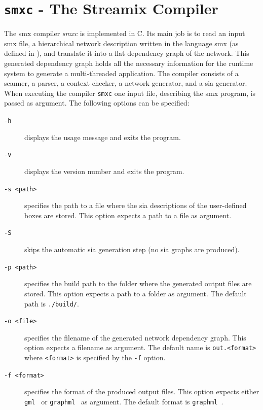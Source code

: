 \section{\texttt{smxc} - The Streamix Compiler}
\label{sect_tool_smxc}
The \gls*{smx} compiler \emph{smxc} is implemented in C.
Its main job is to read an input \gls*{smx} file, \ie a hierarchical network description written in the language \gls*{smx} (as defined in \Chap{\ref{chap_smx}}), and translate it into a flat dependency graph of the network.
This generated dependency graph holds all the necessary information for the runtime system to generate a multi-threaded application.
The compiler consists of a scanner, a parser, a context checker, a network generator, and a \gls{sia} generator.
When executing the compiler \texttt{smxc} one input file, describing the \gls*{smx} program, is passed as argument.
The following options can be specified:
\begin{description}
    \item[\texttt{-h}] displays the usage message and exits the program.
    \item[\texttt{-v}] displays the version number and exits the program.
    \item[\texttt{-s <path>}] specifies the path to a file where the \gls{sia} descriptions of the user-defined boxes are stored.
        This option expects a path to a file as argument.
    \item[\texttt{-S}] skips the automatic \gls{sia} generation step (no \gls{sia} graphs are produced).
    \item[\texttt{-p <path>}] specifies the build path to the folder where the generated output files are stored.
        This option expects a path to a folder as argument.
        The default path is \texttt{./build/}.
    \item[\texttt{-o <file>}] specifies the filename of the generated network dependency graph.
        This option expects a filename as argument.
        The default name is \texttt{out.<format>} where \texttt{<format>} is specified by the \texttt{-f} option.
    \item[\texttt{-f <format>}] specifies the format of the produced output files.
        This option expects either \texttt{gml}~\cite{himsolt1996} or \texttt{graphml}~\cite{brandes2001} as argument.
        The default format is \texttt{graphml}~\cite{brandes2001}.
\end{description}

